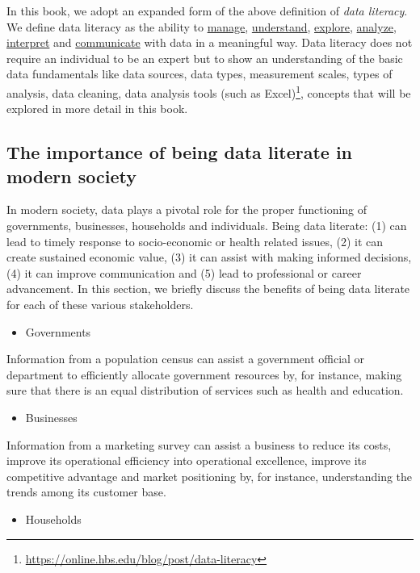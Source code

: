 \documentclass[
]{book}
\providecommand{\tightlist}{%
  \setlength{\itemsep}{0pt}\setlength{\parskip}{0pt}}
\begin{document}
In this book, we adopt an expanded form of the above definition of \emph{data literacy}. We define data literacy as the ability to \ul{manage}, \ul{understand}, \ul{explore}, \ul{analyze}, \ul{interpret} and \ul{communicate} with data in a meaningful way. Data literacy does not require an individual to be an expert but to show an understanding of the basic data fundamentals like data sources, data types, measurement scales, types of analysis, data cleaning, data analysis tools (such as Excel)\footnote{\url{https://online.hbs.edu/blog/post/data-literacy}}, concepts that will be explored in more detail in this book. ~

\subsection{The importance of being data literate in modern society}\label{the-importance-of-being-data-literate-in-modern-society}

In modern society, data plays a pivotal role for the proper functioning of governments, businesses, households and individuals. Being data literate: (1) can lead to timely response to socio-economic or health related issues, (2) it can create sustained economic value, (3) it can assist with making informed decisions, (4) it can improve communication and (5) lead to professional or career advancement. In this section, we briefly discuss the benefits of being data literate for each of these various stakeholders.

\begin{itemize}
\tightlist
\item
  Governments
\end{itemize}

Information from a population census can assist a government official or department to efficiently allocate government resources by, for instance, making sure that there is an equal distribution of services such as health and education.

\begin{itemize}
\tightlist
\item
  Businesses
\end{itemize}

Information from a marketing survey can assist a business to reduce its costs, improve its operational efficiency into operational excellence, improve its competitive advantage and market positioning by, for instance, understanding the trends among its customer base.

\begin{itemize}
\tightlist
\item
  Households
\end{itemize}
\end{document}
